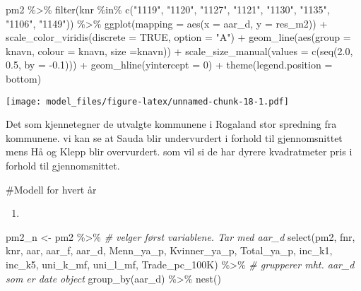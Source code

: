 \documentclass[
]{article}
\newenvironment{Shaded}{\begin{snugshade}}{\end{snugshade}}
\newcommand{\AttributeTok}[1]{\textcolor[rgb]{0.77,0.63,0.00}{#1}}
\newcommand{\CommentTok}[1]{\textcolor[rgb]{0.56,0.35,0.01}{\textit{#1}}}
\newcommand{\ConstantTok}[1]{\textcolor[rgb]{0.00,0.00,0.00}{#1}}
\newcommand{\DecValTok}[1]{\textcolor[rgb]{0.00,0.00,0.81}{#1}}
\newcommand{\FloatTok}[1]{\textcolor[rgb]{0.00,0.00,0.81}{#1}}
\newcommand{\FunctionTok}[1]{\textcolor[rgb]{0.00,0.00,0.00}{#1}}
\newcommand{\NormalTok}[1]{#1}
\newcommand{\OtherTok}[1]{\textcolor[rgb]{0.56,0.35,0.01}{#1}}
\newcommand{\SpecialCharTok}[1]{\textcolor[rgb]{0.00,0.00,0.00}{#1}}
\newcommand{\StringTok}[1]{\textcolor[rgb]{0.31,0.60,0.02}{#1}}
\providecommand{\tightlist}{%
  \setlength{\itemsep}{0pt}\setlength{\parskip}{0pt}}
\begin{document}
\begin{Shaded}
\begin{Highlighting}[]
\NormalTok{pm2 }\SpecialCharTok{\%\textgreater{}\%} \FunctionTok{filter}\NormalTok{(knr }\SpecialCharTok{\%in\%} \FunctionTok{c}\NormalTok{(}\StringTok{"1119"}\NormalTok{, }\StringTok{"1120"}\NormalTok{, }\StringTok{"1127"}\NormalTok{, }\StringTok{"1121"}\NormalTok{, }\StringTok{"1130"}\NormalTok{, }\StringTok{"1135"}\NormalTok{, }\StringTok{"1106"}\NormalTok{, }\StringTok{"1149"}\NormalTok{)) }\SpecialCharTok{\%\textgreater{}\%}
\FunctionTok{ggplot}\NormalTok{(}\AttributeTok{mapping =} \FunctionTok{aes}\NormalTok{(}\AttributeTok{x =}\NormalTok{ aar\_d, }\AttributeTok{y =}\NormalTok{ res\_m2)) }\SpecialCharTok{+}
\FunctionTok{scale\_color\_viridis}\NormalTok{(}\AttributeTok{discrete =} \ConstantTok{TRUE}\NormalTok{, }\AttributeTok{option =} \StringTok{"A"}\NormalTok{) }\SpecialCharTok{+}
\FunctionTok{geom\_line}\NormalTok{(}\FunctionTok{aes}\NormalTok{(}\AttributeTok{group =}\NormalTok{ knavn, }\AttributeTok{colour =}\NormalTok{ knavn, }\AttributeTok{size =}\NormalTok{knavn)) }\SpecialCharTok{+}
\FunctionTok{scale\_size\_manual}\NormalTok{(}\AttributeTok{values =} \FunctionTok{c}\NormalTok{(}\FunctionTok{seq}\NormalTok{(}\FloatTok{2.0}\NormalTok{, }\FloatTok{0.5}\NormalTok{, }\AttributeTok{by =} \SpecialCharTok{{-}}\FloatTok{0.1}\NormalTok{))) }\SpecialCharTok{+}
\FunctionTok{geom\_hline}\NormalTok{(}\AttributeTok{yintercept =} \DecValTok{0}\NormalTok{) }\SpecialCharTok{+}
\FunctionTok{theme}\NormalTok{(}\AttributeTok{legend.position =} \StringTok{\textquotesingle{}bottom\textquotesingle{}}\NormalTok{)}
\end{Highlighting}
\end{Shaded}

\texttt{[image: model\_files/figure-latex/unnamed-chunk-18-1.pdf]}

Det som kjennetegner de utvalgte kommunene i Rogaland stor spredning fra
kommunene. vi kan se at Sauda blir undervurdert i forhold til
gjennomsnittet mens Hå og Klepp blir overvurdert. som vil si de har
dyrere kvadratmeter pris i forhold til gjennomsnittet.

\#Modell for hvert år

\begin{enumerate}
\def\labelenumi{\roman{enumi}.}
\tightlist
\item
\end{enumerate}

\begin{Shaded}
\begin{Highlighting}[]
\NormalTok{pm2\_n }\OtherTok{\textless{}{-}}\NormalTok{ pm2 }\SpecialCharTok{\%\textgreater{}\%} 
\CommentTok{\# velger først variablene. Tar med aar\_d}
   \FunctionTok{select}\NormalTok{(pm2, fnr, knr, aar, aar\_f, aar\_d, Menn\_ya\_p, }
\NormalTok{          Kvinner\_ya\_p, Total\_ya\_p, inc\_k1, inc\_k5, uni\_k\_mf, }
\NormalTok{          uni\_l\_mf, Trade\_pc\_100K) }\SpecialCharTok{\%\textgreater{}\%} 
  \CommentTok{\# grupperer mht. aar\_d som er date object}
  \FunctionTok{group\_by}\NormalTok{(aar\_d) }\SpecialCharTok{\%\textgreater{}\%}
  \FunctionTok{nest}\NormalTok{()}
\end{Highlighting}
\end{Shaded}
\end{document}
